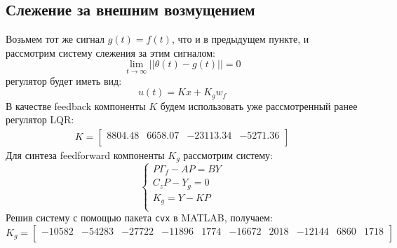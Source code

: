 \subsection{Слежение за внешним возмущением}
Возьмем тот же сигнал $g(t) = f(t)$, что и в предыдущем пункте, и рассмотрим систему слежения за этим сигналом:  
\begin{equation}
    \lim_{t\to\infty} ||\theta(t) - g(t)|| = 0
\end{equation}
регулятор будет иметь вид:
\begin{equation}
    u(t) = Kx + K_g w_f
\end{equation}
В качестве feedback компоненты $K$ будем использовать уже рассмотренный ранее регулятор LQR: 
\begin{eqnarray}
    K = \begin{bmatrix}
        8804.48  & 6658.07  & -23113.34  & -5271.36 \\ 
    \end{bmatrix}
\end{eqnarray}
Для синтеза feedforward компоненты $K_g$ рассмотрим систему:
\begin{equation}
    \begin{cases}
        P\Gamma_f - AP = BY \\
        C_z P - Y_g = 0 \\
        K_g = Y - K P \\
    \end{cases}
\end{equation}
Решив систему с помощью пакета \texttt{cvx} в MATLAB, получаем:
\begin{equation}
    K_g = \begin{bmatrix}
        -10582  & -54283  & -27722  & -11896  & 1774  & -16672  & 2018  & -12144  & 6860  & 1718 \\ 
    \end{bmatrix}
\end{equation}
